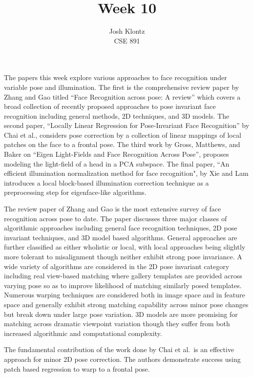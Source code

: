 \documentclass[12pt]{article}
\begin{document}
 
\title{Week 10}
\author{Josh Klontz\\CSE 891}
 
\maketitle
 
The papers this week explore various approaches to face recognition under variable pose and illumination.
The first is the comprehensive review paper by Zhang and Gao titled ``Face Recognition across pose: A review'' which covers a broad collection of recently proposed approaches to pose invariant face recognition including general methods, 2D techniques, and 3D models.
The second paper, ``Locally Linear Regression for Pose-Invariant Face Recognition'' by Chai et al., considers pose correction by a collection of linear mappings of local patches on the face to a frontal pose.
The third work by Gross, Matthews, and Baker on ``Eigen Light-Fields and Face Recognition Across Pose'', proposes modeling the light-field of a head in a PCA subspace.
The final paper, ``An efficient illumination normalization method for face recognition", by Xie and Lam introduces a local block-based illumination correction technique as a preprocessing step for eigenface-like algorithms.
\par
The review paper of Zhang and Gao is the most extensive survey of face recognition across pose to date.
The paper discusses three major classes of algorithmic approaches including general face recognition techniques, 2D pose invariant techniques, and 3D model based algorithms.
General approaches are further classified as either wholistic or local, with local approaches being slightly more tolerant to misalignment though neither exhibit strong pose invariance.
A wide variety of algorithms are considered in the 2D pose invariant category including real view-based matching where gallery templates are provided across varying pose so as to improve likelihood of matching similarly posed templates.
Numerous warping techniques are considered both in image space and in feature space and generally exhibit strong matching capability across minor pose changes but break down under large pose variation.
3D models are more promising for matching across dramatic viewpoint variation though they suffer from both increased algorithmic and computational complexity.
\par
The fundamental contribution of the work done by Chai et al.\ is an effective approach for minor 2D pose correction.
The authors demonstrate success using patch based regression to warp to a frontal pose.
\end{document}
